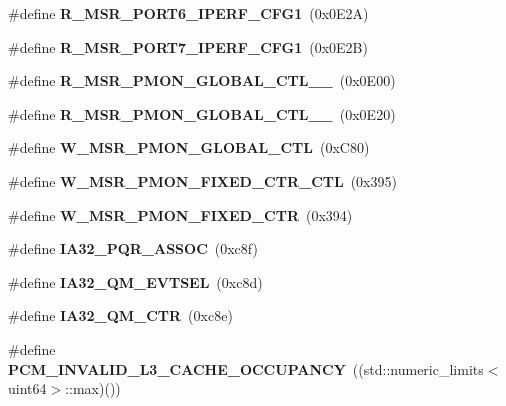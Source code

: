 \begin{DoxyCompactItemize}
\item 
\#define {\bfseries R\+\_\+\+M\+S\+R\+\_\+\+P\+O\+R\+T6\+\_\+\+I\+P\+E\+R\+F\+\_\+\+C\+F\+G1}~(0x0\+E2\+A)\label{types_8h_a4d55e2f6de902b882eab96099404942b}

\item 
\#define {\bfseries R\+\_\+\+M\+S\+R\+\_\+\+P\+O\+R\+T7\+\_\+\+I\+P\+E\+R\+F\+\_\+\+C\+F\+G1}~(0x0\+E2\+B)\label{types_8h_acdcb1863d1298052b1308036f9148120}

\item 
\#define {\bfseries R\+\_\+\+M\+S\+R\+\_\+\+P\+M\+O\+N\+\_\+\+G\+L\+O\+B\+A\+L\+\_\+\+C\+T\+L\+\_\+\_}~(0x0\+E00)\label{types_8h_ae49dab540a902aafc528ed8a3a21374b}

\item 
\#define {\bfseries R\+\_\+\+M\+S\+R\+\_\+\+P\+M\+O\+N\+\_\+\+G\+L\+O\+B\+A\+L\+\_\+\+C\+T\+L\+\_\+\_}~(0x0\+E20)\label{types_8h_a7a9abbcc666865f1760875f7d61cc798}

\item 
\#define {\bfseries W\+\_\+\+M\+S\+R\+\_\+\+P\+M\+O\+N\+\_\+\+G\+L\+O\+B\+A\+L\+\_\+\+C\+T\+L}~(0x\+C80)\label{types_8h_a376e23efde84a32d52b77f0849294aa0}

\item 
\#define {\bfseries W\+\_\+\+M\+S\+R\+\_\+\+P\+M\+O\+N\+\_\+\+F\+I\+X\+E\+D\+\_\+\+C\+T\+R\+\_\+\+C\+T\+L}~(0x395)\label{types_8h_a42bbda41bb44de4240699ce676c55258}

\item 
\#define {\bfseries W\+\_\+\+M\+S\+R\+\_\+\+P\+M\+O\+N\+\_\+\+F\+I\+X\+E\+D\+\_\+\+C\+T\+R}~(0x394)\label{types_8h_a38fcd86b97b8afd997982fbc3313e5e4}

\item 
\#define {\bfseries I\+A32\+\_\+\+P\+Q\+R\+\_\+\+A\+S\+S\+O\+C}~(0xc8f)\label{types_8h_a8de132d539b79a85d803bfccdc9383ad}

\item 
\#define {\bfseries I\+A32\+\_\+\+Q\+M\+\_\+\+E\+V\+T\+S\+E\+L}~(0xc8d)\label{types_8h_a15b6fe9866f264321ea09304a08c2f77}

\item 
\#define {\bfseries I\+A32\+\_\+\+Q\+M\+\_\+\+C\+T\+R}~(0xc8e)\label{types_8h_a92fa198c0abe9741b9b25ed5cb6eff57}

\item 
\#define {\bfseries P\+C\+M\+\_\+\+I\+N\+V\+A\+L\+I\+D\+\_\+\+L3\+\_\+\+C\+A\+C\+H\+E\+\_\+\+O\+C\+C\+U\+P\+A\+N\+C\+Y}~((std\+::numeric\+\_\+limits$<$uint64$>$\+::max)())\label{types_8h_a421622883c042056154261dcc918e062}


\end{DoxyCompactItemize}
